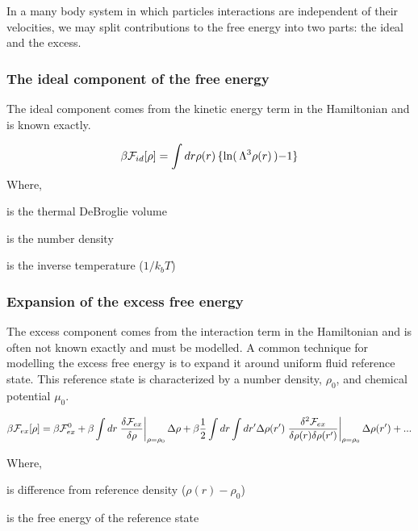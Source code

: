 In a many body system in which particles interactions are independent of their velocities, we may split contributions to the free energy into two parts: the ideal and the excess.

\subsubsection{The ideal component of the free energy}
The ideal component comes from the kinetic energy term in the Hamiltonian and is known exactly.

\begin{equation}
    \beta\mathcal{F}_{id}[\rho] = \int dr \rho(r) \left\lbrace\ln\right(\Lambda^3\rho(r)\left) - 1\right\rbrace
\end{equation}
Where,
\begin{description}[labelindent=10pt, labelsep=10pt]
\item[$\Lambda^3$] is the thermal DeBroglie volume
\item[$\rho(r)$] is the number density
\item[$\beta$] is the inverse temperature ($1/k_bT$)
\end{description}

\subsubsection{Expansion of the excess free energy}
The excess component comes from the interaction term in the Hamiltonian and is often not known exactly and must be modelled.
A common technique for modelling the excess free energy is to expand it around uniform fluid reference state.
This reference state is characterized by a number density, $\rho_0$, and chemical potential $\mu_0$.

\begin{equation}
    \beta\mathcal{F}_{ex}[\rho] = \beta\mathcal{F}_{ex}^0 +
    \beta\int dr \left.\frac{\delta\mathcal{F}_{ex}}{\delta\rho}\right\vert_{\rho = \rho_0} \Delta\rho
    + \beta\frac{1}{2}\int dr \int dr^\prime \Delta\rho(r^\prime)\left.\frac{\delta^2\mathcal{F}_{ex}}{\delta\rho(r)\delta\rho(r^\prime)}\right\vert_{\rho=\rho_0}\Delta\rho(r^\prime) + ...
\end{equation}

Where,
\begin{description}[labelindent=10pt, labelsep=10pt]
    \item[$\Delta\rho$] is difference from reference density ($\rho(r) - \rho_0$)
    \item[$\F_{ex}^0$] is the free energy of the reference state
\end{description}

